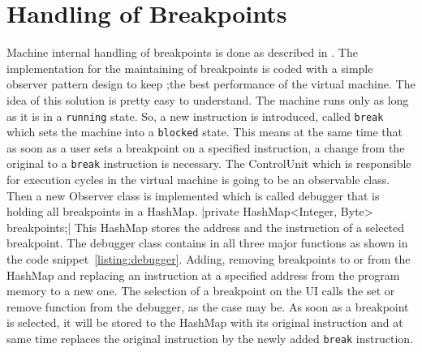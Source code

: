 \section{Handling of Breakpoints}
Machine internal handling of breakpoints is done as described in \cite{bendersky_how_nodate}. The implementation for the maintaining of breakpoints is coded with a simple observer pattern design to keep ;the best performance of the virtual machine. The idea of this solution is pretty easy to understand. The machine runs only as long as it is in a \lstinline$running$ state. So, a new instruction is introduced, called \lstinline$break$ which sets the machine into a \lstinline$blocked$ state. This means at the same time that as soon as a user sets a breakpoint on a specified instruction, a change from the original to a \lstinline$break$ instruction is necessary.
The ControlUnit which is responsible for execution cycles in the virtual machine is going to be an observable class. Then a new Observer class is implemented which is called debugger that is holding all breakpoints in a HashMap.
|private HashMap<Integer, Byte> breakpoints;| 
This HashMap stores the address and the instruction of a selected breakpoint. The debugger class contains in all three major functions as shown in the code snippet~\ref{listing:debugger}. Adding, removing breakpoints to or from the HashMap and replacing an instruction at a specified address from the program memory to a new one. The selection of a breakpoint on the UI calls the set or remove function from the debugger, as the case may be. As soon as a breakpoint is selected, it will be stored to the HashMap with its original instruction and at same time replaces the original instruction by the newly added \lstinline$break$ instruction.
